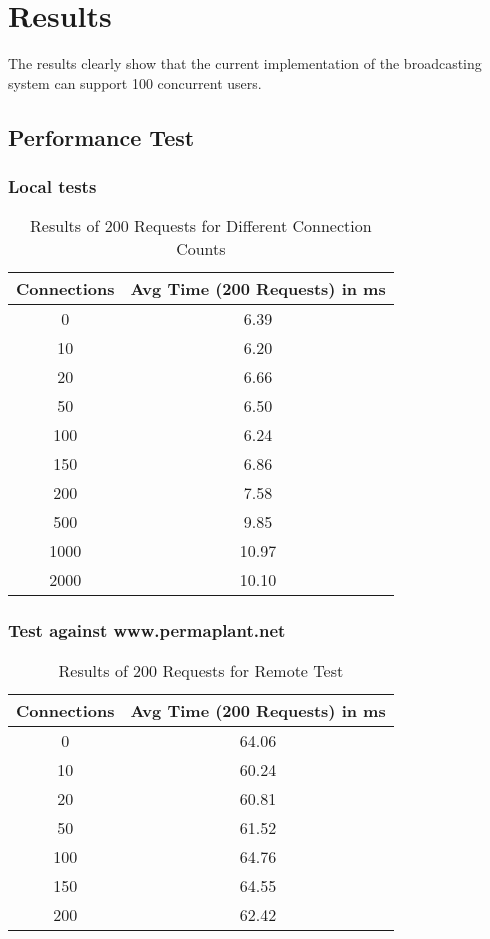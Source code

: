 \documentclass[final,oneside]{vutinfth}
\begin{document}
\chapter{Results}

The results clearly show that the current implementation of the broadcasting system can support 100 concurrent users.

\section{Performance Test}
\subsection{Local tests}

\begin{table}[h!]
    \centering
    \begin{tabular}{cc}
        \toprule
        \textbf{Connections} & \textbf{Avg Time (200 Requests) in ms} \\
        \midrule
        0 & 6.39 \\
        10 & 6.20 \\
        20 & 6.66 \\
        50 & 6.50 \\
        100 & 6.24 \\
        150 & 6.86 \\
        200 & 7.58 \\
        500 & 9.85 \\
        1000 & 10.97 \\
        2000 & 10.10 \\
        \bottomrule
    \end{tabular}
    \caption{Results of 200 Requests for Different Connection Counts}
\end{table}

\subsection{Test against www.permaplant.net}

\begin{table}[h!]
    \centering
    \begin{tabular}{cc}
        \toprule
        \textbf{Connections} & \textbf{Avg Time (200 Requests) in ms} \\
        \midrule
        0 & 64.06 \\
        10 & 60.24 \\
        20 & 60.81 \\
        50 & 61.52 \\
        100 & 64.76 \\
        150 & 64.55 \\
        200 & 62.42 \\
        \bottomrule
    \end{tabular}
    \caption{Results of 200 Requests for Remote Test}
\end{table}
\end{document}

